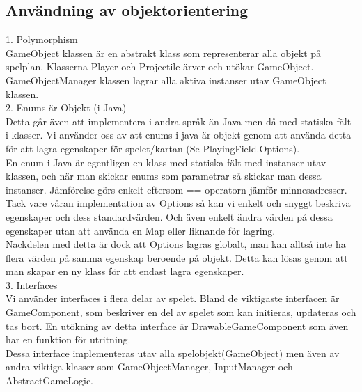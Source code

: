 \subsection{Användning av objektorientering}
1. Polymorphism\\
GameObject klassen är en abstrakt klass som representerar alla objekt på spelplan. Klasserna Player och Projectile ärver och utökar GameObject.\\
GameObjectManager klassen lagrar alla aktiva instanser utav GameObject klassen.\\
\vspace{11pt}
2. Enums är Objekt (i Java)\\
Detta går även att implementera i andra språk än Java men då med statiska fält i klasser.
Vi använder oss av att enums i java är objekt genom att använda detta för att lagra egenskaper för spelet/kartan (Se PlayingField.Options).\\
En enum i Java är egentligen en klass med statiska fält med instanser utav klassen, och när man skickar enums som parametrar så skickar man dessa instanser. Jämförelse görs enkelt eftersom == operatorn jämför minnesadresser.\\
Tack vare våran implementation av Options så kan vi enkelt och snyggt beskriva egenskaper och dess standardvärden. Och även enkelt ändra värden på dessa egenskaper utan att använda en Map eller liknande för lagring.\\
Nackdelen med detta är dock att Options lagras globalt, man kan alltså inte ha flera värden på samma egenskap beroende på objekt. Detta kan lösas genom att man skapar en ny klass för att endast lagra egenskaper.\\
\vspace{11pt}
3. Interfaces\\
Vi använder interfaces i flera delar av spelet. Bland de viktigaste interfacen är GameComponent, som beskriver en del av spelet som kan initieras, updateras och tas bort. En utökning av detta interface är DrawableGameComponent som även har en funktion för utritning.\\
Dessa interface implementeras utav alla spelobjekt(GameObject) men även av andra viktiga klasser som GameObjectManager, InputManager och AbstractGameLogic.\\
